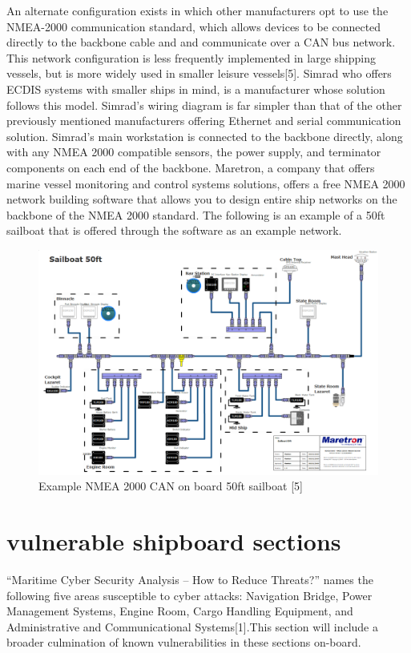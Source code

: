 \documentclass{report}
\begin{document}
\begin{figure}

\end{figure}

An alternate configuration exists in which other manufacturers opt to use the NMEA-2000 communication standard, which allows devices to be connected directly to the backbone cable and and communicate over a CAN bus network. This network configuration is less frequently implemented in large shipping vessels, but is more widely used in smaller leisure vessels[5]. Simrad who offers ECDIS systems with smaller ships in mind, is a manufacturer whose solution follows this model. Simrad's wiring diagram is far simpler than that of the other previously mentioned manufacturers offering Ethernet and serial communication solution. Simrad's main workstation is connected to the backbone directly, along with any NMEA 2000 compatible sensors, the power supply, and terminator components on each end of the backbone. Maretron, a company that offers marine vessel monitoring and control systems solutions, offers a free NMEA 2000 network building software that allows you to design entire ship networks on the backbone of the NMEA 2000 standard. The following is an example of a 50ft sailboat that is offered through the software as an example network.
\begin{figure}[h]
    \centering
    \includegraphics[width=12cm]{Images and Figures/NMEA2K.png}
    \caption{Example NMEA 2000 CAN on board 50ft sailboat   [5]}
    \label{fig:NMEA CAN}
\end{figure}


\chapter{vulnerable shipboard sections}
“Maritime Cyber Security Analysis – How to Reduce Threats?” names the following five areas susceptible to cyber attacks: Navigation Bridge, Power Management Systems, Engine Room, Cargo Handling Equipment, and Administrative and Communicational Systems[1].This section will include a broader culmination of known vulnerabilities in these sections on-board.
\end{document}
